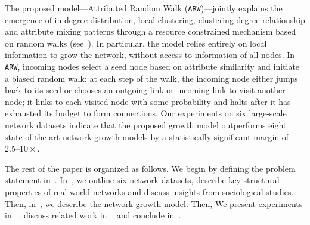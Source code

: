 

The proposed model---Attributed Random Walk (\texttt{ARW})---jointly explains
the emergence of in-degree distribution, local clustering, clustering-degree
relationship and attribute mixing patterns through a resource constrained
mechanism based on random walks (see~). In particular,
the model relies entirely on local information to grow the network, without
access to information of all nodes. In \texttt{ARW}, incoming nodes select a
seed node based on attribute similarity and initiate a biased random walk: at
each step of the walk, the incoming node either jumps back to its seed or
chooses an outgoing link or incoming link to visit another node; it links to
each visited node with some probability and halts after it has exhausted its
budget to form connections.
Our experiments on six large-scale network datasets indicate that the proposed growth model outperforms
eight state-of-the-art network growth models by a
statistically significant margin of 2.5--$10\times$.





The rest of the paper is organized as follows.
We begin by defining the problem statement in~.
In~, we outline six network datasets, describe key structural
properties of real-world networks and discuss insights from sociological studies.
Then, in~, we describe the network growth model. Then, We
present experiments in ~, discuss related work in ~ and conclude in~.
